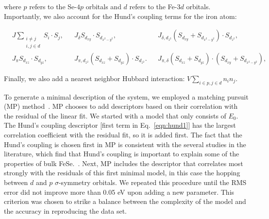 where $p$ refers to the Se-$4p$ orbitals and $d$ refers to the Fe-$3d$ orbitals. 
Importantly, we also account for the Hund's coupling terms for the iron atom:

\begin{align}
  &J \sum_{\substack{i\ne j \\i,j \in d}} S_i \cdot S_j,&
  &J_{\delta} S_{d_{xy}} \cdot S_{d_{x^2-y^2}},&
  &J_{\delta,d_{z^2}} (S_{d_{xy}} + S_{d_{x^2-y^2}}) \cdot S_{d_{z^2}},& \label{eqn:hund1}
  \nonumber \\
  &J_{\pi} S_{d_{xz}} \cdot S_{d_{yz}},&
  &J_{\pi,d_{z^2}} (S_{d_{xz}} + S_{d_{yz}}) \cdot S_{d_{z^2}}.&
  &J_{\pi,\delta} (S_{d_{xz}} + S_{d_{yz}}) \cdot (S_{d_{xy}} + S_{d_{x^2-y^2}}),&
\end{align}

Finally, we also add a nearest neighbor Hubbard interaction: $V \sum_{i\in p, j\in d} n_{i} n_j$.

To generate a minimal description of the system, we employed a matching pursuit (MP) method~\cite{MP_Zhang1993}.
MP chooses to add descriptors based on their correlation with the residual of the linear fit. 
We started with a model that only consists of $E_0$. The Hund's coupling descriptor [first term in Eq.~\eqref{eqn:hund1}]
has the largest correlation coefficient with the residual fit, so it is added first. The fact that the Hund's coupling is chosen first in MP 
is consistent with the several studies in the literature, which find that Hund's coupling is important to explain some 
of the properties of bulk FeSe.~\cite{demedici_hunds_2011,de_medici_janus-faced_2011,georges_strong_2013,busemeyer_competing_2016}. 
Next, MP includes the descriptor that correlates most strongly with the residuals of this first minimal model, in this case the hopping between $d$ and $p$ $\sigma$-symmetry orbitals. 
We repeated this procedure until the RMS error did not improve more than 0.05 eV upon adding a new parameter.
This criterion was chosen to strike a balance between the complexity of the model and the accuracy in reproducing the data set.

